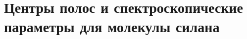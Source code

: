 

\clearpage
\section{Центры полос и спектроскопические параметры для молекулы силана}\label{app:si_fit_tables}








